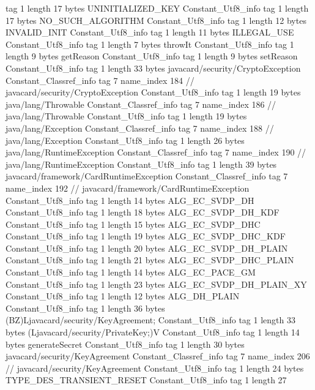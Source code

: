 {{{			tag	1
			length	17
			bytes	UNINITIALIZED_KEY
		}
		Constant_Utf8_info {
			tag	1
			length	17
			bytes	NO_SUCH_ALGORITHM
		}
		Constant_Utf8_info {
			tag	1
			length	12
			bytes	INVALID_INIT
		}
		Constant_Utf8_info {
			tag	1
			length	11
			bytes	ILLEGAL_USE
		}
		Constant_Utf8_info {
			tag	1
			length	7
			bytes	throwIt
		}
		Constant_Utf8_info {
			tag	1
			length	9
			bytes	getReason
		}
		Constant_Utf8_info {
			tag	1
			length	9
			bytes	setReason
		}
		Constant_Utf8_info {
			tag	1
			length	33
			bytes	javacard/security/CryptoException
		}
		Constant_Classref_info {
			tag	7
			name_index	184		// javacard/security/CryptoException
		}
		Constant_Utf8_info {
			tag	1
			length	19
			bytes	java/lang/Throwable
		}
		Constant_Classref_info {
			tag	7
			name_index	186		// java/lang/Throwable
		}
		Constant_Utf8_info {
			tag	1
			length	19
			bytes	java/lang/Exception
		}
		Constant_Classref_info {
			tag	7
			name_index	188		// java/lang/Exception
		}
		Constant_Utf8_info {
			tag	1
			length	26
			bytes	java/lang/RuntimeException
		}
		Constant_Classref_info {
			tag	7
			name_index	190		// java/lang/RuntimeException
		}
		Constant_Utf8_info {
			tag	1
			length	39
			bytes	javacard/framework/CardRuntimeException
		}
		Constant_Classref_info {
			tag	7
			name_index	192		// javacard/framework/CardRuntimeException
		}
		Constant_Utf8_info {
			tag	1
			length	14
			bytes	ALG_EC_SVDP_DH
		}
		Constant_Utf8_info {
			tag	1
			length	18
			bytes	ALG_EC_SVDP_DH_KDF
		}
		Constant_Utf8_info {
			tag	1
			length	15
			bytes	ALG_EC_SVDP_DHC
		}
		Constant_Utf8_info {
			tag	1
			length	19
			bytes	ALG_EC_SVDP_DHC_KDF
		}
		Constant_Utf8_info {
			tag	1
			length	20
			bytes	ALG_EC_SVDP_DH_PLAIN
		}
		Constant_Utf8_info {
			tag	1
			length	21
			bytes	ALG_EC_SVDP_DHC_PLAIN
		}
		Constant_Utf8_info {
			tag	1
			length	14
			bytes	ALG_EC_PACE_GM
		}
		Constant_Utf8_info {
			tag	1
			length	23
			bytes	ALG_EC_SVDP_DH_PLAIN_XY
		}
		Constant_Utf8_info {
			tag	1
			length	12
			bytes	ALG_DH_PLAIN
		}
		Constant_Utf8_info {
			tag	1
			length	36
			bytes	(BZ)Ljavacard/security/KeyAgreement;
		}
		Constant_Utf8_info {
			tag	1
			length	33
			bytes	(Ljavacard/security/PrivateKey;)V
		}
		Constant_Utf8_info {
			tag	1
			length	14
			bytes	generateSecret
		}
		Constant_Utf8_info {
			tag	1
			length	30
			bytes	javacard/security/KeyAgreement
		}
		Constant_Classref_info {
			tag	7
			name_index	206		// javacard/security/KeyAgreement
		}
		Constant_Utf8_info {
			tag	1
			length	24
			bytes	TYPE_DES_TRANSIENT_RESET
		}
		Constant_Utf8_info {
			tag	1
			length	27
}}}
